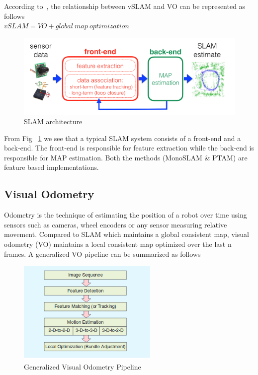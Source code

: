 According to~\cite{scaramuzza2011visual}, the relationship between vSLAM and VO can be represented as follows\\

$vSLAM = VO + global\ map\ optimization$


\begin{figure}
  \includegraphics[width=\textwidth]{./figures/slam_model.png}
\caption{SLAM architecture~\cite{cadena2016past}}
\label{fig:slammodel}       %
\end{figure}

From Fig ~\ref{fig:slammodel} we see that a typical SLAM system consists of a front-end and a back-end. The front-end is responsible for feature extraction while the back-end is responsible for MAP estimation. Both the methods (MonoSLAM \& PTAM) are feature based implementations. 

\subsection{Visual Odometry}

Odometry is the technique of estimating the position of a robot over time using sensors such as cameras,  wheel encoders or any sensor measuring relative movement. Compared to SLAM which maintains a global consistent map, visual odometry (VO) maintains a local consistent map optimized over the last n frames. A generalized VO pipeline can be summarized as follows

\begin{figure}[!htb]
  \includegraphics[width=\textwidth,height=5cm,keepaspectratio]{./figures/vo.png}
\caption{Generalized Visual Odometry Pipeline~\cite{scaramuzza2011visual}}
\label{fig:vo}       %
\end{figure}

